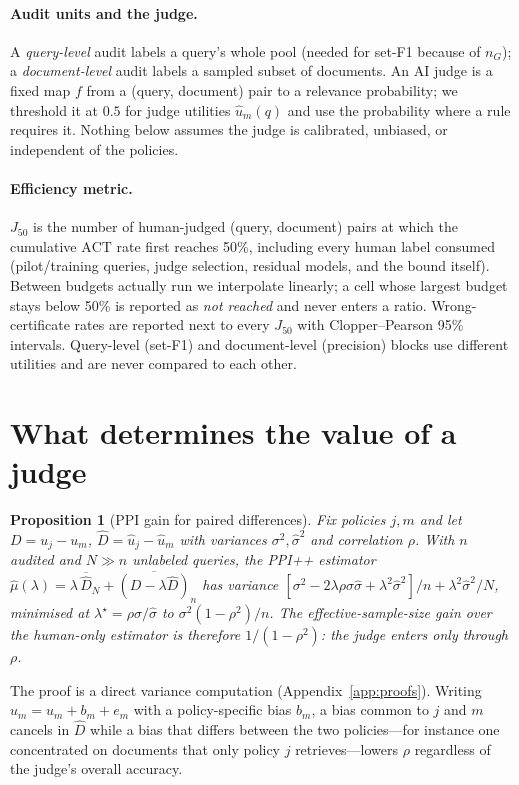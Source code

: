 \documentclass{article}
\newtheorem{proposition}{Proposition}
\newcommand{\ACT}{\mathrm{ACT}}
\newcommand{\Jfifty}{J_{50}}
\begin{document}
\paragraph{Audit units and the judge.} A \emph{query-level} audit labels a query's whole pool (needed for set-F1 because of $n_G$); a \emph{document-level} audit labels a sampled subset of documents. An AI judge is a fixed map $f$ from a (query, document) pair to a relevance probability; we threshold it at $0.5$ for judge utilities $\hat u_m(q)$ and use the probability where a rule requires it. Nothing below assumes the judge is calibrated, unbiased, or independent of the policies.

\paragraph{Efficiency metric.} $\Jfifty$ is the number of human-judged (query, document) pairs at which the cumulative $\ACT$ rate first reaches 50\%, including every human label consumed (pilot/training queries, judge selection, residual models, and the bound itself). Between budgets actually run we interpolate linearly; a cell whose largest budget stays below 50\% is reported as \emph{not reached} and never enters a ratio. Wrong-certificate rates are reported next to every $\Jfifty$ with Clopper--Pearson 95\% intervals. Query-level (set-F1) and document-level (precision) blocks use different utilities and are never compared to each other.

\section{What determines the value of a judge}\label{sec:judge}
\begin{proposition}[PPI gain for paired differences]\label{prop:A}
Fix policies $j,m$ and let $D=u_j-u_m$, $\hat D=\hat u_j-\hat u_m$ with variances $\sigma^2,\hat\sigma^2$ and correlation $\rho$. With $n$ audited and $N\gg n$ unlabeled queries, the PPI++ estimator $\hat\mu(\lambda)=\lambda\,\overline{\hat D}_N+\overline{(D-\lambda\hat D)}_n$ has variance $[\sigma^2-2\lambda\rho\sigma\hat\sigma+\lambda^2\hat\sigma^2]/n+\lambda^2\hat\sigma^2/N$, minimised at $\lambda^\star=\rho\sigma/\hat\sigma$ to $\sigma^2(1-\rho^2)/n$. The effective-sample-size gain over the human-only estimator is therefore $1/(1-\rho^2)$: the judge enters only through $\rho$.
\end{proposition}
The proof is a direct variance computation (Appendix~\ref{app:proofs}). Writing $\hat u_m=u_m+b_m+e_m$ with a policy-specific bias $b_m$, a bias common to $j$ and $m$ cancels in $\hat D$ while a bias that differs between the two policies---for instance one concentrated on documents that only policy $j$ retrieves---lowers $\rho$ regardless of the judge's overall accuracy.
\end{document}
